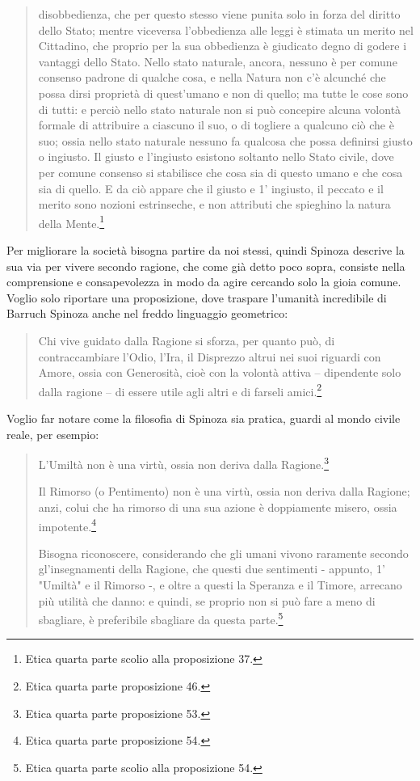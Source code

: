 \begin{quotation}
	disobbedienza, che per questo stesso viene punita solo in forza del diritto dello Stato; mentre viceversa l’obbedienza alle leggi è stimata un merito nel Cittadino, che proprio per la
	sua obbedienza è giudicato degno di godere i vantaggi dello Stato. Nello stato naturale, ancora, nessuno è per comune consenso padrone di qualche cosa, e nella Natura non c’è alcunché che possa dirsi proprietà di quest’umano e non di quello; ma tutte le cose sono di
	tutti: e perciò nello stato naturale non si può concepire alcuna volontà formale di attribuire a ciascuno il suo, o di togliere a qualcuno ciò che è suo; ossia nello stato naturale nessuno fa qualcosa che possa definirsi giusto o ingiusto. Il giusto e l’ingiusto esistono soltanto
	nello Stato civile, dove per comune consenso si stabilisce che cosa sia di questo umano e
	che cosa sia di quello. E da ciò appare che il giusto e 1’ ingiusto, il peccato e il merito sono
	nozioni estrinseche, e non attributi che spieghino la natura della Mente.\footnote{Etica quarta parte scolio alla proposizione 37.}
\end{quotation}

Per migliorare la società bisogna partire da noi stessi, quindi Spinoza descrive la sua via per vivere secondo ragione, che come già detto poco sopra, consiste nella comprensione e consapevolezza in modo da agire cercando solo la gioia comune. Voglio solo riportare una proposizione, dove traspare l'umanità incredibile di Barruch Spinoza anche nel freddo linguaggio geometrico:

\begin{quotation}
	\small Chi vive guidato dalla Ragione si sforza, per quanto può, di contraccambiare l’Odio, l’Ira,
	il Disprezzo altrui nei suoi riguardi con Amore, ossia con Generosità, cioè con la volontà attiva – dipendente solo dalla ragione – di essere utile agli altri e di farseli amici.\footnote{Etica quarta parte proposizione 46.}
\end{quotation}

Voglio far notare come la filosofia di Spinoza sia pratica, guardi al mondo civile reale, per esempio:

\begin{quotation}
	\small  L'Umiltà  non è una virtù, ossia non deriva dalla Ragione.\footnote{Etica quarta parte proposizione 53.}
	
	Il Rimorso (o Pentimento) non è una virtù, ossia non deriva dalla Ragione; anzi, colui
	che ha rimorso di una sua azione è doppiamente misero, ossia impotente.\footnote{Etica quarta parte proposizione 54.}
	
	Bisogna riconoscere, considerando che gli umani vivono raramente secondo gl’insegnamenti della Ragione, che questi due sentimenti - appunto, 1’ "Umiltà" e il Rimorso -, e oltre a questi la Speranza e il Timore, arrecano più utilità che danno: e quindi, se
	proprio non si può fare a meno di sbagliare, è preferibile sbagliare da questa parte.\footnote{Etica quarta parte scolio alla proposizione 54.}
\end{quotation}

